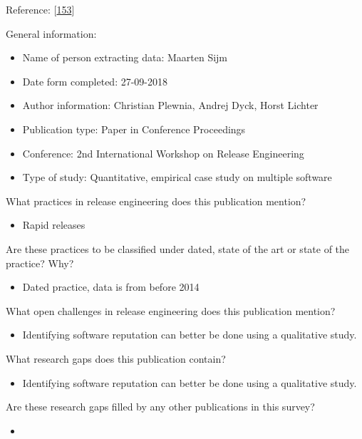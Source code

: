 \documentclass[]{book}
\providecommand{\tightlist}{%
  \setlength{\itemsep}{0pt}\setlength{\parskip}{0pt}}
\begin{document}
Reference: {[}\protect\hyperlink{ref-plewnia2014a}{153}{]}

General information:

\begin{itemize}
\tightlist
\item
  Name of person extracting data: Maarten Sijm
\item
  Date form completed: 27-09-2018
\item
  Author information: Christian Plewnia, Andrej Dyck, Horst Lichter
\item
  Publication type: Paper in Conference Proceedings
\item
  Conference: 2nd International Workshop on Release Engineering
\item
  Type of study: Quantitative, empirical case study on multiple software
\end{itemize}

What practices in release engineering does this publication mention?

\begin{itemize}
\tightlist
\item
  Rapid releases
\end{itemize}

Are these practices to be classified under dated, state of the art or
state of the practice? Why?

\begin{itemize}
\tightlist
\item
  Dated practice, data is from before 2014
\end{itemize}

What open challenges in release engineering does this publication
mention?

\begin{itemize}
\tightlist
\item
  Identifying software reputation can better be done using a qualitative
  study.
\end{itemize}

What research gaps does this publication contain?

\begin{itemize}
\tightlist
\item
  Identifying software reputation can better be done using a qualitative
  study.
\end{itemize}

Are these research gaps filled by any other publications in this survey?

\begin{itemize}
\item
\end{itemize}
\end{document}
